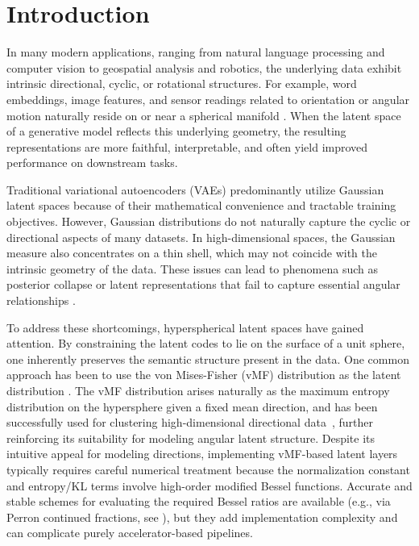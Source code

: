 \documentclass{article}
\begin{document}
\section{Introduction}

In many modern applications, ranging from natural language processing and computer vision to geospatial analysis and robotics, the underlying data exhibit intrinsic directional, cyclic, or rotational structures. For example, word embeddings, image features, and sensor readings related to orientation or angular motion naturally reside on or near a spherical manifold \citep{scott2021mises,scott2022empirical,circlus}. When the latent space of a generative model reflects this underlying geometry, the resulting representations are more faithful, interpretable, and often yield improved performance on downstream tasks.

Traditional variational autoencoders (VAEs) predominantly utilize Gaussian latent spaces because of their mathematical convenience and tractable training objectives. However, Gaussian distributions do not naturally capture the cyclic or directional aspects of many datasets. In high-dimensional spaces, the Gaussian measure also concentrates on a thin shell, which may not coincide with the intrinsic geometry of the data. These issues can lead to phenomena such as posterior collapse or latent representations that fail to capture essential angular relationships \citep{davidson2018hyperspherical}.

To address these shortcomings, hyperspherical latent spaces have gained attention. By constraining the latent codes to lie on the surface of a unit sphere, one inherently preserves the semantic structure present in the data. One common approach has been to use the von Mises-Fisher (vMF) distribution as the latent distribution \citep{davidson2018hyperspherical,xu2018spherical}. The vMF distribution arises naturally as the maximum entropy distribution on the hypersphere given a fixed mean direction, and has been successfully used for clustering high-dimensional directional data~\citep{banerjee2005vmf}, further reinforcing its suitability for modeling angular latent structure. Despite its intuitive appeal for modeling directions, implementing vMF-based latent layers typically requires careful numerical treatment because the normalization constant and entropy/KL terms involve high-order modified Bessel functions. Accurate and stable schemes for evaluating the required Bessel ratios are available (e.g., via Perron continued fractions, see \cite{hornik2014maximum}), but they add implementation complexity and can complicate purely accelerator-based pipelines.
\end{document}
